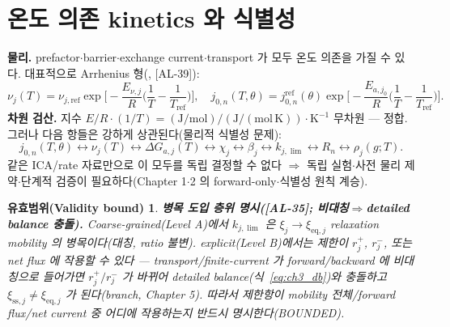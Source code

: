 \documentclass[11pt,a4paper]{article}
\newtheorem*{boundbox}{유효범위(Validity bound)}
\newcommand{\eq}{\mathrm{eq}}
\newcommand{\sstat}{\mathrm{ss}}
\newcommand{\AL}[1]{\textsf{[AL-#1]}}
\begin{document}
\section{온도 의존 kinetics 와 식별성}\label{sec:ch3_ident}
\textbf{물리.} prefactor$\cdot$barrier$\cdot$exchange current$\cdot$transport 가 모두 온도 의존을 가질 수 있다.
대표적으로 Arrhenius 형(\cite{fly2020}, \AL{39}):
\begin{equation}
\nu_j(T)=\nu_{j,\mathrm{ref}}\exp\!\Big[-\frac{E_{\nu,j}}{R}\Big(\frac1T-\frac1{T_{\mathrm{ref}}}\Big)\Big],\quad
j_{0,n}(T,\theta)=j_{0,n}^{\mathrm{ref}}(\theta)\exp\!\Big[-\frac{E_{a,j_0}}{R}\Big(\frac1T-\frac1{T_{\mathrm{ref}}}\Big)\Big].
\label{eq:ch3_T}
\end{equation}
\textbf{차원 검산.} 지수 $E/R\cdot(1/T)=\mathrm{(J/mol)}/\mathrm{(J/(mol\,K))}\cdot\mathrm{K^{-1}}$ 무차원 — 정합.
그러나 다음 항들은 강하게 상관된다(물리적 식별성 문제):
\begin{equation}
j_{0,n}(T,\theta)\leftrightarrow\nu_j(T)\leftrightarrow\Delta G_{a,j}(T)\leftrightarrow\chi_j\leftrightarrow\beta_j\leftrightarrow k_{j,\lim}\leftrightarrow R_n\leftrightarrow\rho_j(g;T).
\label{eq:ch3_ident_chain}
\end{equation}
같은 ICA/rate 자료만으로 이 모두를 독립 결정할 수 없다 $\Rightarrow$ 독립 실험$\cdot$사전 물리 제약$\cdot$단계적
검증이 필요하다(Chapter 1$\cdot$2 의 forward-only$\cdot$식별성 원칙 계승).
\begin{boundbox}
\textbf{병목 도입 층위 명시(\AL{35}; 비대칭$\Rightarrow$detailed balance 충돌).} Coarse-grained(Level A)에서
$k_{j,\lim}$ 은 $\xi_j\to\xi_{\eq,j}$ relaxation mobility 의 병목이다(대칭, ratio 불변). explicit(Level B)에서는
제한이 $r_j^+$, $r_j^-$, 또는 net flux 에 작용할 수 있다 — transport/finite-current 가 forward/backward 에
\emph{비대칭}으로 들어가면 $r_j^+/r_j^-$ 가 바뀌어 detailed balance(식~\eqref{eq:ch3_db})와 충돌하고
$\xi_{\sstat,j}\ne\xi_{\eq,j}$ 가 된다(branch, Chapter 5). 따라서 제한항이 mobility 전체/forward flux/net current
중 \emph{어디}에 작용하는지 반드시 명시한다(BOUNDED).
\end{boundbox}

\end{document}

